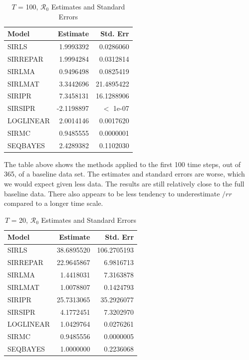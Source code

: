 \documentclass[12pt]{article}
\newcommand{\rr}{\ensuremath{\mathcal{R}_0}}
\begin{document}
\begin{table}[H]
	
	\caption{\label{tab:} $T$ = 100, $\rr$ Estimates and Standard Errors}
	\centering
	\begin{tabular}[t]{l|r|r}
		\hline
		Model & Estimate & Std. Err\\
		\hline
		SIRLS & 1.9993392 & 0.0286060\\
		\hline
		SIRREPAR & 1.9994284 & 0.0312814\\
		\hline
		SIRLMA & 0.9496498 & 0.0825419\\
		\hline
		SIRLMAT & 3.3442696 & 21.4895422\\
		\hline
		SIRIPR & 7.3458131 & 16.1288906\\
		\hline
		SIRSIPR & -2.1198897 & $<$ 1e-07\\
		\hline
		LOGLINEAR & 2.0014146 & 0.0017620\\
		\hline
		SIRMC & 0.9485555 & 0.0000001\\
		\hline
		SEQBAYES & 2.4289382 & 0.1102030\\
		\hline
	\end{tabular}
\end{table}

The table above shows the methods applied to the first 100 time steps, out of 365, of a baseline data set. The estimates and standard errors are worse, which we would expect given less data. The results are still relatively close to the full baseline data. There also appears to be less tendency to underestimate $/rr$ compared to a longer time scale.

\begin{table}[H]
	
	\caption{\label{tab:} $T$ = 20, $\rr$ Estimates and Standard Errors}
	\centering
	\begin{tabular}[t]{l|r|r}
		\hline
		Model & Estimate & Std. Err\\
		\hline
		SIRLS & 38.6895520 & 106.2705193\\
		\hline
		SIRREPAR & 22.9645867 & 6.9816713\\
		\hline
		SIRLMA & 1.4418031 & 7.3163878\\
		\hline
		SIRLMAT & 1.0078807 & 0.1424793\\
		\hline
		SIRIPR & 25.7313065 & 35.2926077\\
		\hline
		SIRSIPR & 4.1772451 & 7.3202970\\
		\hline
		LOGLINEAR & 1.0429764 & 0.0276261\\
		\hline
		SIRMC & 0.9485556 & 0.0000005\\
		\hline
		SEQBAYES & 1.0000000 & 0.2236068\\
		\hline
	\end{tabular}
\end{table}
\end{document}
